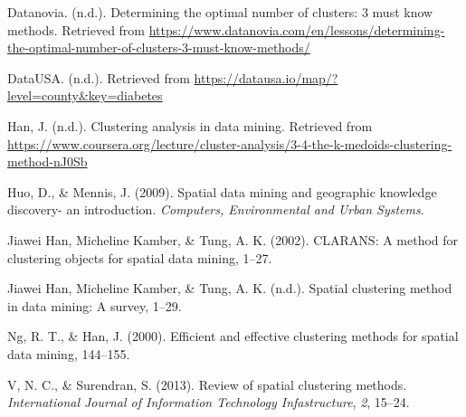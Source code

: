 \documentclass[12pt,twoside]{amherstthesis}
\begin{document}
  \hypertarget{refs}{}
  \hypertarget{ref-Rec7}{}
  Datanovia. (n.d.). Determining the optimal number of clusters: 3 must
  know methods. Retrieved from
  \url{https://www.datanovia.com/en/lessons/determining-the-optimal-number-of-clusters-3-must-know-methods/}
  
  \hypertarget{ref-data}{}
  DataUSA. (n.d.). Retrieved from
  \url{https://datausa.io/map/?level=county\&key=diabetes}
  
  \hypertarget{ref-Rec13}{}
  Han, J. (n.d.). Clustering analysis in data mining. Retrieved from
  \url{https://www.coursera.org/lecture/cluster-analysis/3-4-the-k-medoids-clustering-method-nJ0Sb}
  
  \hypertarget{ref-Rec1}{}
  Huo, D., \& Mennis, J. (2009). Spatial data mining and geographic
  knowledge discovery- an introduction. \emph{Computers, Environmental and
  Urban Systems}.
  
  \hypertarget{ref-Rec3}{}
  Jiawei Han, Micheline Kamber, \& Tung, A. K. (2002). CLARANS: A method
  for clustering objects for spatial data mining, 1--27.
  
  \hypertarget{ref-Rec2}{}
  Jiawei Han, Micheline Kamber, \& Tung, A. K. (n.d.). Spatial clustering
  method in data mining: A survey, 1--29.
  
  \hypertarget{ref-Rec6}{}
  Ng, R. T., \& Han, J. (2000). Efficient and effective clustering methods
  for spatial data mining, 144--155.
  
  \hypertarget{ref-Rec5}{}
  V, N. C., \& Surendran, S. (2013). Review of spatial clustering methods.
  \emph{International Journal of Information Technology Infastructure},
  \emph{2}, 15--24.


\end{document}
